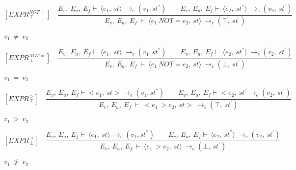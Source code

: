 	
	
	
	
	
	\[	
	[EXPR^{NOT=}_{\ \top}] \quad	
	\dfrac{E_v, \ E_a, \ E_f \vdash \ \langle e_1, \ st \rangle \ \rightarrow_e (v_1, st^{''}) \qquad E_v, \ E_a, \ E_f \vdash \ \langle e_2, \ st^{''} \rangle \ \rightarrow_e (v_2, \ st^{'})}{E_v, \ E_a, \ E_f \ \vdash \ \langle e_1 \ NOT= e_2, \ st \rangle \ \rightarrow_e (\top, \ st^{'})}	
	\]
	
	
	\begin{math}		
		v_1 \ \not= \ v_2		
	\end{math} 
	
	
	
	
	
	
	
	
	\[
	[EXPR^{NOT=}_{\ \bot}] \quad	
	\dfrac{E_v, \ E_a, \ E_f \vdash \ \langle e_1, \ st \rangle \ \rightarrow_e (v_1, st^{''}) \qquad E_v, \ E_a, \ E_f \vdash \ \langle e_2, \ st^{''} \rangle \ \rightarrow_e (v_2, \ st^{'})}{E_v, \ E_a, \ E_f \ \vdash \ \langle e_1 \ NOT= e_2, \ st \rangle \ \rightarrow_e (\bot, \ st^{'})}	
	\]
	
	
	\begin{math}		
		v_1 \ = \ v_2		
	\end{math} 
	
	
	
	
	
	
	
	
	\[	
	[EXPR^{\ >}_{\ \top}] \quad	
	\dfrac{E_v, \ E_a, \ E_f \vdash <e_1, \ st> \rightarrow_e (v_1, st^{''}) \qquad E_v, \ E_a, \ E_f \vdash <e_2, \ st^{''} \rightarrow_e (v_2, \ st^{'})}{E_v, \ E_a, \ E_f \ \vdash \ <e_1 \ > e_2, \ st> \ \rightarrow_e (\top, \ st^{'})}	
	\]
	
	
	\begin{math}		
		v_1 \ > \ v_2		
	\end{math} 
	

	
	
	
	
	
	\[	
	[EXPR^{\ >}_{\ \bot}] \quad	
	\dfrac{E_v, \ E_a, \ E_f \vdash \ \langle e_1, \ st \rangle \ \rightarrow_e (v_1, st^{''}) \qquad E_v, \ E_a, \ E_f \vdash \ \langle e_2, \ st^{''} \rangle \ \rightarrow_e (v_2, \ st^{'})}{E_v, \ E_a, \ E_f \ \vdash \ \langle e_1 \ > e_2, \ st \rangle \ \rightarrow_e (\bot, \ st^{'})}
	\]
	
	
	\begin{math}		
		v_1 \ \not> \ v_2		
	\end{math} 
	
